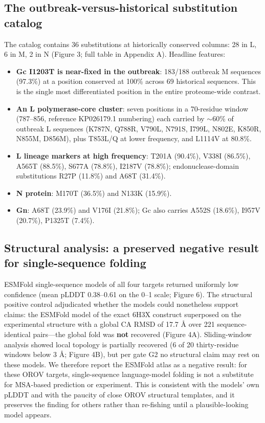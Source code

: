 \documentclass[12pt]{article}
\begin{document}
\subsection{The outbreak-versus-historical substitution catalog}
The catalog contains 36 substitutions at historically conserved columns: 28 in L, 6 in M, 2 in N (Figure 3; full table in Appendix A). Headline features:
\begin{itemize}
\item \textbf{Gc I1203T is near-fixed in the outbreak}: 183/188 outbreak M sequences (97.3\%) at a position conserved at 100\% across 69 historical sequences. This is the single most differentiated position in the entire proteome-wide contrast.
\item \textbf{An L polymerase-core cluster}: seven positions in a 70-residue window (787--856, reference KP026179.1 numbering) each carried by $\sim$60\% of outbreak L sequences (K787N, Q788R, V790L, N791S, I799L, N802E, K850R, N855M, D856M), plus T853L/Q at lower frequency, and L1114V at 80.8\%.
\item \textbf{L lineage markers at high frequency}: T201A (90.4\%), V338I (86.5\%), A565T (88.5\%), S677A (78.8\%), I2187V (78.8\%); endonuclease-domain substitutions R27P (11.8\%) and A68T (31.4\%).
\item \textbf{N protein}: M170T (36.5\%) and N133K (15.9\%).
\item \textbf{Gn}: A68T (23.9\%) and V176I (21.8\%); Gc also carries A552S (18.6\%), I957V (20.7\%), P1325T (7.4\%).
\end{itemize}

\subsection{Structural analysis: a preserved negative result for single-sequence folding}
ESMFold single-sequence models of all four targets returned uniformly low confidence (mean pLDDT 0.38--0.61 on the 0--1 scale; Figure 6). The structural positive control adjudicated whether the models could nonetheless support claims: the ESMFold model of the exact 6H3X construct superposed on the experimental structure with a global CA RMSD of 17.7 \AA{} over 221 sequence-identical pairs---the global fold was \textbf{not} recovered (Figure 4A). Sliding-window analysis showed local topology is partially recovered (6 of 20 thirty-residue windows below 3 \AA{}; Figure 4B), but per gate G2 no structural claim may rest on these models. We therefore report the ESMFold atlas as a negative result: for these OROV targets, single-sequence language-model folding is not a substitute for MSA-based prediction or experiment. This is consistent with the models' own pLDDT and with the paucity of close OROV structural templates, and it preserves the finding for others rather than re-fishing until a plausible-looking model appears.
\end{document}

